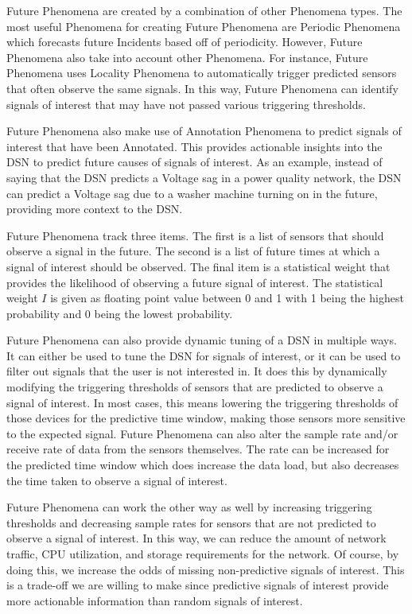 Future Phenomena are created by a combination of other Phenomena types. The most useful Phenomena for creating Future Phenomena are Periodic Phenomena which forecasts future Incidents based off of periodicity. However, Future Phenomena also take into account other Phenomena. For instance, Future Phenomena uses Locality Phenomena to automatically trigger predicted sensors that often observe the same signals. In this way, Future Phenomena can identify signals of interest that may have not passed various triggering thresholds.

Future Phenomena also make use of Annotation Phenomena to predict signals of interest that have been Annotated. This provides actionable insights into the DSN to predict future causes of signals of interest. As an example, instead of saying that the DSN predicts a Voltage sag in a power quality network, the DSN can predict a Voltage sag due to a washer machine turning on in the future, providing more context to the DSN\@.

Future Phenomena track three items. The first is a list of sensors that should observe a signal in the future. The second is a list of future times at which a signal of interest should be observed. The final item is a statistical weight that provides the likelihood of observing a future signal of interest. The statistical weight $I$ is given as floating point value between 0 and 1 with 1 being the highest probability and 0 being the lowest probability.

Future Phenomena can also provide dynamic tuning of a DSN in multiple ways. It can either be used to tune the DSN for signals of interest, or it can be used to filter out signals that the user is not interested in. It does this by dynamically modifying the triggering thresholds of sensors that are predicted to observe a signal of interest. In most cases, this means lowering the triggering thresholds of those devices for the predictive time window, making those sensors more sensitive to the expected signal. Future Phenomena can also alter the sample rate and/or receive rate of data from the sensors themselves. The rate can be increased for the predicted time window which does increase the data load, but also decreases the time taken to observe a signal of interest.

Future Phenomena can work the other way as well by increasing triggering thresholds and decreasing sample rates for sensors that are not predicted to observe a signal of interest. In this way, we can reduce the amount of network traffic, CPU utilization, and storage requirements for the network. Of course, by doing this, we increase the odds of missing non-predictive signals of interest. This is a trade-off we are willing to make since predictive signals of interest provide more actionable information than random signals of interest.


